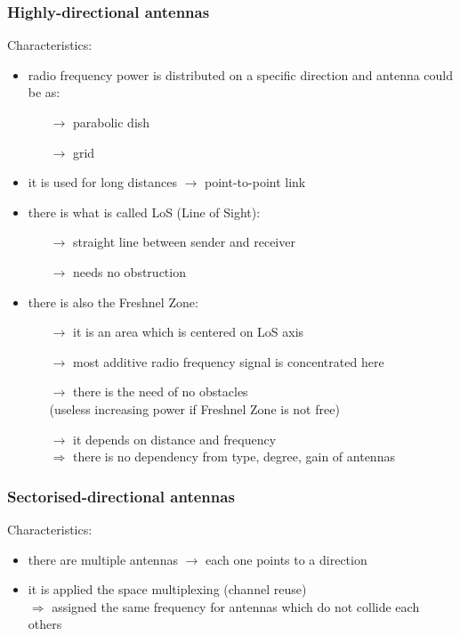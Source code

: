 \subsubsection{Highly-directional antennas}

Characteristics:
\begin{itemize}
    \item radio frequency power is distributed on a specific direction and antenna could be as:
    \begin{itemize}
        \item[$\rightarrow$] parabolic dish
        \item[$\rightarrow$] grid
    \end{itemize}
    \item it is used for long distances $\rightarrow$ point-to-point link
    \item there is what is called LoS (Line of Sight):
    \begin{itemize}
        \item[$\rightarrow$] straight line between sender and receiver
        \item[$\rightarrow$] needs no obstruction
    \end{itemize}
    \item there is also the Freshnel Zone:
    \begin{itemize}
        \item[$\rightarrow$] it is an area which is centered on LoS axis
        \item[$\rightarrow$] most additive radio frequency signal is concentrated here
        \item[$\rightarrow$] there is the need of no obstacles\\ (useless increasing power if Freshnel Zone is not free)
        \item[$\rightarrow$] it depends on distance and frequency\\ $\Rightarrow$ there is no dependency from type, degree, gain of antennas
    \end{itemize}
\end{itemize}
\subsubsection{Sectorised-directional antennas}

Characteristics:
\begin{itemize}
    \item there are multiple antennas $\rightarrow$ each one points to a direction
    \item it is applied the space multiplexing (channel reuse)\\ $\Rightarrow$ assigned the same frequency for antennas which do not collide each others 
\end{itemize}